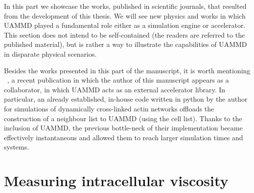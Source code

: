 \documentclass[ twoside,openright,titlepage,numbers=noenddot,%
headinclude,footinclude,cleardoublepage=empty,abstract=on,
BCOR=5mm,paper=b5,fontsize=11pt, dvipsnames
]{scrreprt}
\newcommand{\uammd}{\gls{UAMMD}\xspace}
\begin{document}
In this part we showcase the works, published in scientific journals, that resulted from the development of this thesis. We will see new physics and works in which \uammd played a fundamental role either as a simulation engine or accelerator.
This section does not intend to be self-contained (the readers are referred to the published material), but is rather a way to illustrate the capabilities of UAMMD in disparate physical scenarios.

Besides the works presented in this part of the manuscript, it is worth mentioning ~\cite{Maxian2021Fibers}, a recent publication in which the author of this manuscript appears as a collaborator, in which UAMMD acts as an external accelerator library. In particular, an already established, in-house code written in python by the author for simulations of dynamically cross-linked actin networks offloads the construction of a neighbour list to UAMMD (using the cell list). Thanks to the inclusion of UAMMD, the previous bottle-neck of their implementation became effectively instantaneous and allowed them to reach larger simulation times and systems.

\chapter{Measuring intracellular viscosity}
\end{document}
